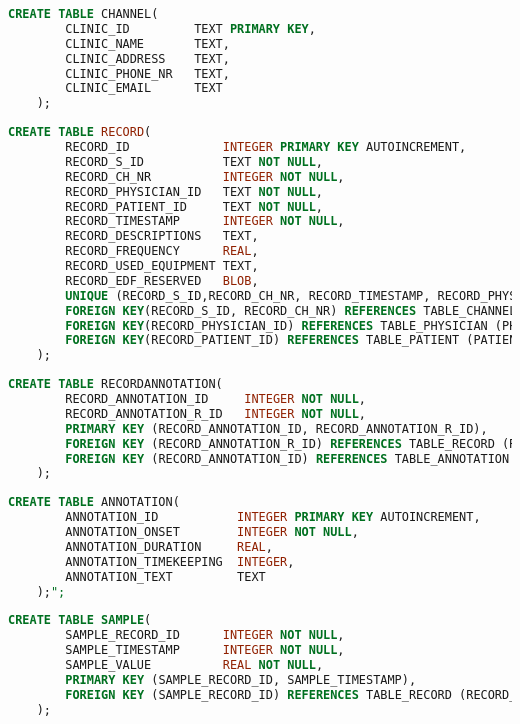 \begin{lstlisting}[caption={SQLite code for creating table Clinic}, label = {listing:SQLClinic},language=SQL]
    CREATE TABLE CHANNEL(
    	CLINIC_ID         TEXT PRIMARY KEY, 
        CLINIC_NAME       TEXT, 
        CLINIC_ADDRESS    TEXT, 
        CLINIC_PHONE_NR   TEXT, 
        CLINIC_EMAIL      TEXT 
    );
\end{lstlisting}
\begin{lstlisting}[caption={SQLite code for creating table Record}, label = {listing:SQLRecord},language=SQL]
    CREATE TABLE RECORD(
    	RECORD_ID             INTEGER PRIMARY KEY AUTOINCREMENT, 
        RECORD_S_ID           TEXT NOT NULL, 
        RECORD_CH_NR          INTEGER NOT NULL, 
        RECORD_PHYSICIAN_ID   TEXT NOT NULL, 
        RECORD_PATIENT_ID     TEXT NOT NULL, 
        RECORD_TIMESTAMP      INTEGER NOT NULL, 
        RECORD_DESCRIPTIONS   TEXT, 
        RECORD_FREQUENCY      REAL, 
        RECORD_USED_EQUIPMENT TEXT, 
        RECORD_EDF_RESERVED   BLOB, 
        UNIQUE (RECORD_S_ID,RECORD_CH_NR, RECORD_TIMESTAMP, RECORD_PHYSICIAN_ID, RECORD_PATIENT_ID),
        FOREIGN KEY(RECORD_S_ID, RECORD_CH_NR) REFERENCES TABLE_CHANNEL (CHANNEL_S_ID, CHANNEL_NR) ON DELETE CASCADE,
        FOREIGN KEY(RECORD_PHYSICIAN_ID) REFERENCES TABLE_PHYSICIAN (PHY_PERSON_ID) ON DELETE CASCADE,
        FOREIGN KEY(RECORD_PATIENT_ID) REFERENCES TABLE_PATIENT (PATIENT_PER_ID) ON DELETE CASCADE
    );
\end{lstlisting}
\begin{lstlisting}[caption={SQLite code for creating table RecordAnnotation}, label = {listing:SQLRecordAnnotation},language=SQL]
    CREATE TABLE RECORDANNOTATION(
        RECORD_ANNOTATION_ID     INTEGER NOT NULL, 
        RECORD_ANNOTATION_R_ID   INTEGER NOT NULL, 
        PRIMARY KEY (RECORD_ANNOTATION_ID, RECORD_ANNOTATION_R_ID), 
        FOREIGN KEY (RECORD_ANNOTATION_R_ID) REFERENCES TABLE_RECORD (RECORD_ID) ON DELETE CASCADE, 
        FOREIGN KEY (RECORD_ANNOTATION_ID) REFERENCES TABLE_ANNOTATION (ANNOTATION_ID) ON DELETE CASCADE 
    );
\end{lstlisting}
\begin{lstlisting}[caption={SQLite code for creating table Annotation}, label = {listing:SQLAnnotation},language=SQL]
    CREATE TABLE ANNOTATION(
        ANNOTATION_ID           INTEGER PRIMARY KEY AUTOINCREMENT, 
        ANNOTATION_ONSET        INTEGER NOT NULL, 
        ANNOTATION_DURATION     REAL, 
        ANNOTATION_TIMEKEEPING  INTEGER, 
        ANNOTATION_TEXT         TEXT 
    );";
\end{lstlisting}
\begin{lstlisting}[caption={SQLite code for creating table Sample}, label = {listing:SQLSample},language=SQL]
    CREATE TABLE SAMPLE(
        SAMPLE_RECORD_ID      INTEGER NOT NULL,
        SAMPLE_TIMESTAMP      INTEGER NOT NULL, 
        SAMPLE_VALUE          REAL NOT NULL, 
        PRIMARY KEY (SAMPLE_RECORD_ID, SAMPLE_TIMESTAMP), 
        FOREIGN KEY (SAMPLE_RECORD_ID) REFERENCES TABLE_RECORD (RECORD_ID) ON DELETE CASCADE 
    );
\end{lstlisting}